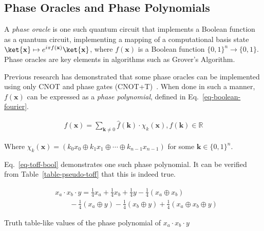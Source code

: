 \subsection{Phase Oracles and Phase Polynomials}
\label{Pre:oracle}
A {\it phase oracle} is one such quantum circuit that implements a Boolean function as a
quantum circuit, implementing a mapping of a computational basis state
$\ket{\mathbf{x}} \mapsto e^{i \pi f(\mathbf{x})}\ket{\mathbf{x}}$, where $f(\mathbf{x})$
is a Boolean function $\{0,1\}^n \rightarrow \{0,1\}$. Phase oracles are key elements in
algorithms such as Grover's Algorithm.

Previous research has demonstrated that some phase oracles can be implemented using only
CNOT and phase gates
(CNOT+T)~\cite{bib-amy-cnot}. When done in such a manner, $f(\mathbf{x})$ can be expressed
as a {\it phase polynomial},
defined in Eq.~\ref{eq-boolean-fourier}.

\begin{equation}
  \begin{aligned}
    \label{eq-boolean-fourier}
    f(\mathbf{x}) = \sum_{\mathbf{k} \neq 0} \hat{f}(\mathbf{k}) \cdot \chi_k(\mathbf{x}),
    \hat{f}(\mathbf{k}) \in \mathbb{R}
  \end{aligned}
\end{equation}

Where $\chi_k(\mathbf{x}) = ( k_0 x_0 \oplus k_1 x_1 \oplus \cdots \oplus k_{n-1} x_{n-1})$
for some $\mathbf{k} \in \{0,1\}^{n}$.

Eq.~\ref{eq-toff-bool} demonstrates one such phase polynomial. It can be verified from
Table~\ref{table-pseudo-toff} that this is indeed true.

\begin{equation}
  \label{eq-toff-bool}
  \begin{aligned}
    &x_a \cdot x_b \cdot y = \frac{1}{4}x_a + \frac{1}{4}x_b + \frac{1}{4}y - \frac{1}{4}(x_a \oplus x_b) \\
    &\qquad -\frac{1}{4}(x_a \oplus y) - \frac{1}{4}(x_b \oplus y) + \frac{1}{4}(x_a \oplus x_b \oplus y)
  \end{aligned}
\end{equation}

\def\arraystretch{1.3}
\begin{table*}[h]
  \begin{minipage}{\textwidth}
    \begin{center}
      \scalebox{1.0} {
        
      }
      \caption{Truth table-like values of the phase polynomial of $x_a \cdot x_b \cdot y$}
      \label{table-pseudo-toff}
    \end{center}
  \end{minipage}
  \vspace{-0.5cm}
\end{table*}
\def\arraystretch{1.0}

